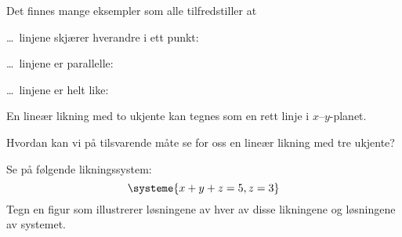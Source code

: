 \begin{losning}
Det finnes mange eksempler som alle tilfredstiller at
\begin{punkt}
\ldots\ linjene skjærer hverandre i ett punkt:
\end{punkt}
\begin{center}
\end{center}
\begin{punkt}
\ldots\ linjene er parallelle:
\end{punkt}
\begin{center}
\end{center}
\begin{punkt}
\ldots\ linjene er helt like:
\end{punkt}
\begin{center}
\end{center}
\end{losning}



\begin{oppgave}
En lineær likning med to ukjente kan tegnes som en rett linje i $x$--$y$-planet.
\begin{punkt}
Hvordan kan vi på tilsvarende måte se for oss en lineær likning med tre ukjente?
\end{punkt}
\begin{punkt}
Se på følgende likningssystem:
\[
\systeme{
  x + y + z = 5,
  z = 3
}
\]
Tegn en figur som illustrerer løsningene av hver av disse likningene
og løsningene av systemet.
\end{punkt}
\end{oppgave}

